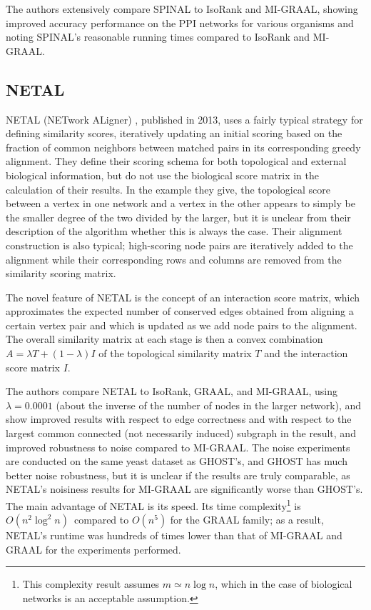 \documentclass[12pt]{thesis}
\theoremstyle{plain}
\theoremstyle{definition}
\theoremstyle{remark}
\begin{document}
The authors extensively compare SPINAL to IsoRank and MI-GRAAL, showing improved accuracy performance on the PPI networks for various organisms and noting SPINAL's reasonable running times compared to IsoRank and MI-GRAAL.

\subsection{NETAL}

NETAL (NETwork ALigner) \cite{Neyshabur_2013}, published in 2013, uses a fairly typical strategy for defining similarity scores, iteratively updating an initial scoring based on the fraction of common neighbors between matched pairs in its corresponding greedy alignment. They define their scoring schema for both topological and external biological information, but do not use the biological score matrix in the calculation of their results. In the example they give, the topological score between a vertex in one network and a vertex in the other appears to simply be the smaller degree of the two divided by the larger, but it is unclear from their description of the algorithm whether this is always the case. Their alignment construction is also typical; high-scoring node pairs are iteratively added to the alignment while their corresponding rows and columns are removed from the similarity scoring matrix. 

The novel feature of NETAL is the concept of an interaction score matrix, which approximates the expected number of conserved edges obtained from aligning a certain vertex pair and which is updated as we add node pairs to the alignment. The overall similarity matrix at each stage is then a convex combination $A = \lambda T + (1-\lambda) I$ of the topological similarity matrix $T$ and the interaction score matrix $I$. 

The authors compare NETAL to IsoRank, GRAAL, and MI-GRAAL, using $\lambda=0.0001$ (about the inverse of the number of nodes in the larger network), and show improved results with respect to edge correctness and with respect to the largest common connected (not necessarily induced) subgraph in the result, and improved robustness to noise compared to MI-GRAAL. The noise experiments are conducted on the same yeast dataset as GHOST's, and GHOST has much better noise robustness, but it is unclear if the results are truly comparable, as NETAL's noisiness results for MI-GRAAL are significantly worse than GHOST's. The main advantage of NETAL is its speed. Its time complexity\footnote{This complexity result assumes $m \simeq n\log n$, which in the case of biological networks is an acceptable assumption.} is $O(n^2\log^2n)$\, compared to $O(n^5)$ for the GRAAL family; as a result, NETAL's runtime was hundreds of times lower than that of MI-GRAAL and GRAAL for the experiments performed.
\end{document}
